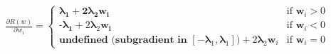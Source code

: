 \documentclass[preview]{standalone}
\begin{document}
\begin{align*}
\frac{\partial R(w)}{\partial w_i} =\begin{cases}\boldsymbol{\lambda}_\textbf{1} + \textbf{2}\boldsymbol{\lambda}_\textbf{2} \mathbf{w_i} & \text{if } \mathbf{w}_i > 0 \\\textbf{-}\boldsymbol{\lambda}_\textbf{1} + 2\mathbf{\lambda}_2 \mathbf{w_i} & \text{if } \mathbf{w}_i < 0 \\\textbf{undefined (subgradient in } [-\boldsymbol{\lambda}_1, \boldsymbol{\lambda}_1]\textbf{)} + 2\mathbf{\lambda}_2 \mathbf{w}_i & \text{if } \mathbf{w}_i = 0\end{cases}
\end{align*}
\end{document}
